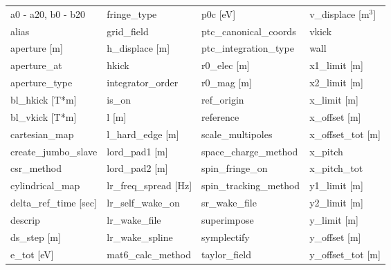  \begin{tabular}{llll} \toprule
a0 - a20, b0 - b20             & fringe_type                    & p0c [eV]                       & v_displace [m$^3$]             \\
alias                          & grid_field                     & ptc_canonical_coords           & vkick                          \\
aperture [m]                   & h_displace [m]                 & ptc_integration_type           & wall                           \\
aperture_at                    & hkick                          & r0_elec [m]                    & x1_limit [m]                   \\
aperture_type                  & integrator_order               & r0_mag [m]                     & x2_limit [m]                   \\
bl_hkick [T*m]                 & is_on                          & ref_origin                     & x_limit [m]                    \\
bl_vkick [T*m]                 & l [m]                          & reference                      & x_offset [m]                   \\
cartesian_map                  & l_hard_edge [m]                & scale_multipoles               & x_offset_tot [m]               \\
create_jumbo_slave             & lord_pad1 [m]                  & space_charge_method            & x_pitch                        \\
csr_method                     & lord_pad2 [m]                  & spin_fringe_on                 & x_pitch_tot                    \\
cylindrical_map                & lr_freq_spread [Hz]            & spin_tracking_method           & y1_limit [m]                   \\
delta_ref_time [sec]           & lr_self_wake_on                & sr_wake_file                   & y2_limit [m]                   \\
descrip                        & lr_wake_file                   & superimpose                    & y_limit [m]                    \\
ds_step [m]                    & lr_wake_spline                 & symplectify                    & y_offset [m]                   \\
e_tot [eV]                     & mat6_calc_method               & taylor_field                   & y_offset_tot [m]               \\

\end{tabular}
